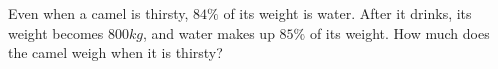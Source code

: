 Even when a camel is thirsty, $84\%$ of its weight is water. After it drinks, its weight becomes $800kg$, and water makes up $85\%$ of its weight. How much does the camel weigh when it is thirsty?

